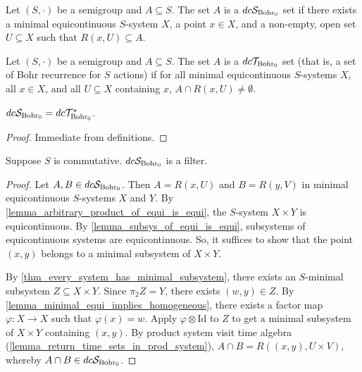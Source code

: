 
\begin{definition}
\label{def_dcsyndeticbohr}
\leanok{}
Let $(S,\cdot)$ be a semigroup and $A \subseteq S$. The set $A$ is a $dc\mathcal{S}_{\text{Bohr}_0}$ set if there exists a minimal equicontinuous $S$-system $X$, a point $x \in X$, and a non-empty, open set $U \subseteq X$ such that $R(x,U) \subseteq A$.
\end{definition}

\begin{definition}
\label{def_dcthickbohr}
\leanok{}
Let $(S,\cdot)$ be a semigroup and $A \subseteq S$. The set $A$ is a $dc\mathcal{T}_{\text{Bohr}_0}$ set (that is, a set of Bohr recurrence for $S$ actions) if for all minimal equicontinuous $S$-systems $X$, all $x \in X$, and all $U \subseteq X$ containing $x$, $A \cap R(x,U) \neq \emptyset$.
\end{definition}

\begin{lemma}
    \label{lemma_dcsyndeticbohr_dcthickbohr_dual}
    \leanok{}
    $dc\mathcal{S}_{\text{Bohr}_0} = dc\mathcal{T}_{\text{Bohr}_0}^*$.
\end{lemma}

\begin{proof}
    Immediate from definitions.
\end{proof}

\begin{lemma}
    \label{lemma_dcsyndeticbohr_is_filter}
    \leanok{}
    Suppose $S$ is commutative. $dc\mathcal{S}_{\text{Bohr}_0}$ is a filter.
\end{lemma}

\begin{proof}
    Let $A, B \in dc\mathcal{S}_{\text{Bohr}_0}$.  Then $A = R(x,U)$ and $B = R(y,V)$ in minimal equicontinuous $S$-systems $X$ and $Y$.  By \cref{lemma_arbitrary_product_of_equi_is_equi}, the $S$-system $X \times Y$ is equicontinuous.  By \cref{lemma_subsys_of_equi_is_equi}, subsystems of equicontinuous systems are equicontinuous.  So, it suffices to show that the point $(x,y)$ belongs to a minimal subsystem of $X \times Y$.

    By \cref{thm_every_system_has_minimal_subsystem}, there exists an $S$-minimal subsystem $Z \subseteq X \times Y$.  Since $\pi_2 Z = Y$, there exists $(w,y) \in Z$.  By \cref{lemma_minimal_equi_implies_homogeneous}, there exists a factor map $\varphi: X \to X$ such that $\varphi(x) = w$.  Apply $\varphi \otimes \text{Id}$ to $Z$ to get a minimal subsystem of $X \times Y$ containing $(x,y)$. By product system visit time algebra (\cref{lemma_return_time_sets_in_prod_system}), $A \cap B = R((x,y), U \times V)$, whereby $A \cap B \in dc\mathcal{S}_{\text{Bohr}_0}$.
\end{proof}

